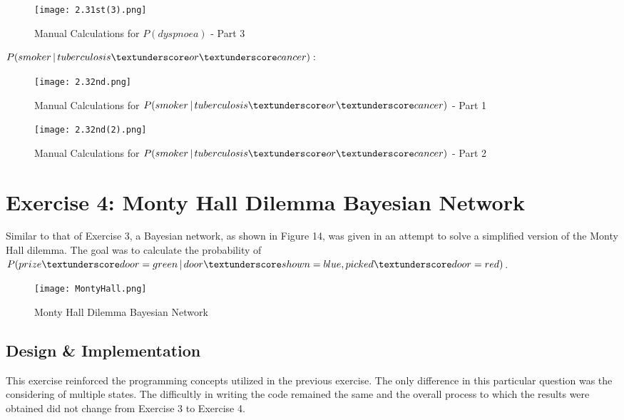 \documentclass[11pt]{article}
\newcommand{\forceindent}{\leavevmode{\parindent=1em\indent}}
\begin{document}
\clearpage
\begin{figure}[h!]
  \centering
{\texttt{[image: 2.31st(3).png]}}
    \caption{Manual Calculations for $P(dyspnoea)$ - Part 3 }
\end{figure} 
 
\clearpage 
$P(smoker\,|\,tuberculosis \textunderscore or \textunderscore cancer): $ \\

\begin{figure}[h!]
  \centering
{\texttt{[image: 2.32nd.png]}}
    \caption{Manual Calculations for $P(smoker\,|\,tuberculosis \textunderscore or \textunderscore cancer)$ - Part 1 }
\end{figure} 


\begin{figure}[h!]
  \centering
{\texttt{[image: 2.32nd(2).png]}}
    \caption{Manual Calculations for $P(smoker\,|\,tuberculosis \textunderscore or \textunderscore cancer)$ - Part 2 }
\end{figure} 


\section{Exercise 4: Monty Hall Dilemma Bayesian Network}
\forceindent Similar to that of Exercise 3, a Bayesian network, as shown in Figure 14, was given in an attempt to solve a simplified version of the Monty Hall dilemma. The goal was to calculate the probability of $P(prize \textunderscore door=green \,|\, door \textunderscore shown=blue , picked \textunderscore door = red)$. \\
\begin{figure}[h!]
  \centering
{\texttt{[image: MontyHall.png]}}
    \caption{Monty Hall Dilemma Bayesian Network}
\end{figure}


\subsection{Design \& Implementation}
\forceindent This exercise reinforced the programming concepts utilized in the previous exercise. The only difference in this particular question was the considering of multiple states. The difficultly in writing the code remained the same and the overall process to which the results were obtained did not change from Exercise 3 to Exercise 4.\\
\end{document}
